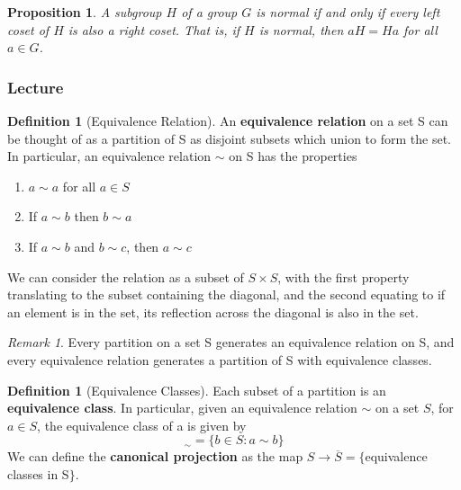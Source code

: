 \documentclass[12pt]{article}
\newtheorem{prop}[thm]{Proposition}
\theoremstyle{definition}
\newtheorem{defn}[thm]{Definition}
\theoremstyle{remark}
\newtheorem{rmk}[thm]{Remark}
\numberwithin{equation}{section}
\newcommand\B[1]{\textbf{ #1}}
\begin{document}
\vspace{15pt}

\begin{prop}
        A subgroup $H$ of a group $G$ is normal if and only if every left coset of $H$ is also a right coset. That is, if $H$ is normal, then $aH = Ha$ for all $a \in G$.
\end{prop}


\vspace{15pt}





\subsubsection{Lecture}

\begin{defn}[Equivalence Relation]
        An \B{equivalence relation} on a set S can be thought of as a partition of S as disjoint subsets which union to form the set. In particular, an equivalence relation $\sim$ on S has the properties \begin{enumerate}
                \item $a \sim a$ for all $a \in S$
                \item If $a \sim b$ then $b \sim a$
                \item If $a \sim b$ and $b \sim c$, then $a \sim c$
        \end{enumerate}
        We can consider the relation as a subset of $S \times S$, with the first property translating to the subset containing the diagonal, and the second equating to if an element is in the set, its reflection across the diagonal is also in the set.
\end{defn}

\begin{rmk}
        Every partition on a set S generates an equivalence relation on S, and every equivalence relation generates a partition of S with equivalence classes.
\end{rmk}

\vspace{15pt}

\begin{defn}[Equivalence Classes]
        Each subset of a partition is an \B{equivalence class}. In particular, given an equivalence relation $\sim$ on a set $S$, for $a \in S$, the equivalence class of a is given by \begin{equation}
                [a]_{\sim} = \{b \in S: a \sim b\}
        \end{equation}
        We can define the \B{canonical projection} as the map $S \rightarrow \overline{S} = \{$equivalence classes in S$\}$.
\end{defn}
\end{document}
